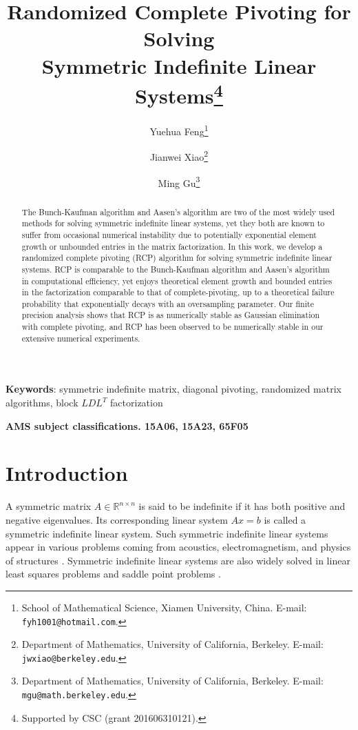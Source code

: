 \documentclass[11pt]{article}
\begin{document}
\title{Randomized Complete Pivoting for Solving \\ Symmetric Indefinite Linear Systems\thanks{Supported by CSC (grant 201606310121).}}
\author{Yuehua Feng\thanks{School of Mathematical Science, Xiamen University, China. E-mail: {\tt fyh1001@hotmail.com}.}
\and Jianwei Xiao\thanks{Department of Mathematics, University of California, Berkeley. E-mail: {\tt jwxiao@berkeley.edu}.}
\and Ming Gu\thanks{Department of Mathematics, University of California, Berkeley. E-mail: {\tt mgu@math.berkeley.edu}.}
}
%
\maketitle

\begin{abstract}

The Bunch-Kaufman algorithm and Aasen's algorithm are two of the most widely used methods for solving symmetric indefinite linear systems, yet they both are known to suffer from occasional numerical instability due to potentially exponential element growth or unbounded entries in the matrix factorization. In this work, we develop a randomized complete pivoting (RCP) algorithm for solving symmetric indefinite linear systems. RCP is comparable to the Bunch-Kaufman algorithm and Aasen's algorithm in computational efficiency, yet enjoys theoretical element growth and bounded entries in the factorization comparable to that of complete-pivoting, up to a theoretical failure probability that exponentially decays with an oversampling parameter. Our finite precision analysis shows that RCP is as numerically stable as Gaussian elimination with complete pivoting, and RCP has been observed to be numerically stable in our extensive numerical experiments.
\end{abstract}

\medskip
{\small
{\bf Keywords}: symmetric indefinite matrix, diagonal pivoting, randomized matrix algorithms, block $LDL^T$ factorization


\medskip
{\bf AMS subject classifications. 15A06, 15A23, 65F05}
}
\section{Introduction}

A symmetric matrix $A \in \mathbb{R}^{n \times n}$ is said to be indefinite if it has both positive and negative eigenvalues. Its corresponding linear system $Ax = b$ is called a symmetric indefinite linear system. Such symmetric indefinite linear systems appear in various problems coming from acoustics, electromagnetism, and physics of structures \cite{nedelec2001acoustic}. Symmetric indefinite linear systems are also widely solved in linear least squares problems \cite{bjorck1996numerical} and saddle point problems \cite{benzi2005numerical}.
\end{document}

